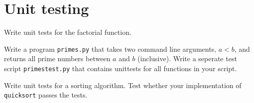 \section{Unit testing} %
\begin{questions}
\label{sec:unit_testing}

    \label{sub:factorial}
        Write unit tests for the factorial function.


    \label{sub:prime_numbers}

        Write a program \texttt{primes.py} that takes two command line arguments,
        $a < b$, and returns all prime numbers between $a$ and $b$ (inclusive).
        Write a seperate test script \texttt{primestest.py} that contains
        unittests for all functions in your script.


    \label{sub:quicksort}
        Write unit tests for a sorting algorithm.
        Test whether your implementation of \texttt{quicksort} passes the tests.

\end{questions}
